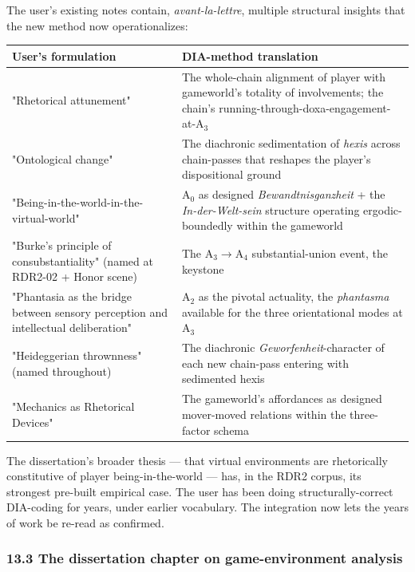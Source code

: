 \documentclass[11pt]{report}
\begin{document}
The user's existing notes contain, \textit{avant-la-lettre}, multiple structural insights that the new method now operationalizes:


\begin{table}[H]
\renewcommand{\arraystretch}{1.25}
\begin{tabularx}{\textwidth}{>{\RaggedRight\arraybackslash}X>{\RaggedRight\arraybackslash}X}
\toprule
User's formulation & DIA-method translation \\
\midrule
"Rhetorical attunement" & The whole-chain alignment of player with gameworld's totality of involvements; the chain's running-through-doxa-engagement-at-A$_3$ \\
"Ontological change" & The diachronic sedimentation of \textit{hexis} across chain-passes that reshapes the player's dispositional ground \\
"Being-in-the-world-in-the-virtual-world" & A$_0$ as designed \textit{Bewandtnisganzheit} + the \textit{In-der-Welt-sein} structure operating ergodic-boundedly within the gameworld \\
"Burke's principle of consubstantiality" (named at RDR2-02 + Honor scene) & The A$_3$$\rightarrow$\allowbreak A$_4$ substantial-union event, the keystone \\
"Phantasia as the bridge between sensory perception and intellectual deliberation" & A$_2$ as the pivotal actuality, the \textit{phantasma} available for the three orientational modes at A$_3$ \\
"Heideggerian thrownness" (named throughout) & The diachronic \textit{Geworfenheit}-character of each new chain-pass entering with sedimented hexis \\
"Mechanics as Rhetorical Devices" & The gameworld's affordances as designed mover-moved relations within the three-factor schema \\
\bottomrule
\end{tabularx}
\end{table}


The dissertation's broader thesis — that virtual environments are rhetorically constitutive of player being-in-the-world — has, in the RDR2 corpus, its strongest pre-built empirical case. The user has been doing structurally-correct DIA-coding for years, under earlier vocabulary. The integration now lets the years of work be re-read as confirmed.


\subsubsection{13.3 The dissertation chapter on game-environment analysis}
\end{document}
